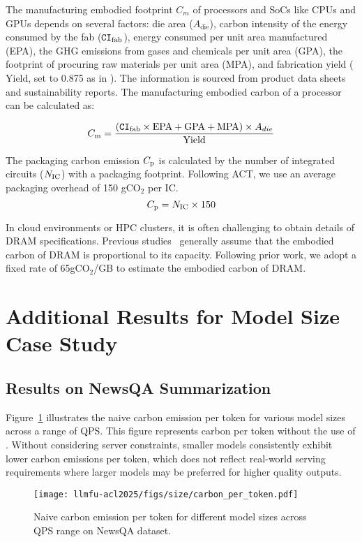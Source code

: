 The manufacturing embodied footprint $C_m$ of processors and SoCs like CPUs and GPUs depends on several factors: die area ($A_{\text{die}}$), carbon intensity of the energy consumed by the fab ($\texttt{CI}_{\rm fab}$), energy consumed per unit area manufactured (EPA), the GHG emissions from gases and chemicals per unit area (GPA), the footprint of procuring raw materials per unit area (MPA), and fabrication yield ($\text{Yield}$, set to 0.875 as in \citet{gupta2022act}). The information is sourced from product data sheets and sustainability reports. The manufacturing embodied carbon of a processor can be calculated as:

\begin{equation}
    C_{\rm m} = \frac{(\texttt{CI}_{\rm fab} \times \text{EPA} + \text{GPA} + \text{MPA})\times A_{die}}{\text{Yield}}
\end{equation}

The packaging carbon emission $C_{\rm p}$ is calculated by the number of integrated circuits ($N_{\rm IC}$) with a packaging footprint. Following ACT,  we use an average packaging overhead of 150 gCO$_2$ per IC.
\begin{equation}
    C_{\rm p} = N_{\rm IC} \times 150
\end{equation}

In cloud environments or HPC clusters, it is often challenging to obtain details of DRAM specifications. Previous studies~\cite{li2023toward, mem2023} generally assume that the embodied carbon of DRAM is proportional to its capacity. Following prior work, we adopt a fixed rate of 65gCO$_2$/GB to estimate the embodied carbon of DRAM.



\section{Additional Results for Model Size Case Study}\label{sec:appendix_model_size}

\subsection{Results on NewsQA Summarization}
\label{sec:appendix_model_size_newsqa}
Figure~\ref{fig:size_carbon_per_token} illustrates the naive carbon emission per token for various model sizes across a range of QPS. This figure represents carbon per token without the use of \SYSTEM{}. Without considering server constraints, smaller models consistently exhibit lower carbon emissions per token, which does not reflect real-world serving requirements where larger models may be preferred for higher quality outputs.
\begin{figure}[!t]
    \centering
    \texttt{[image: llmfu-acl2025/figs/size/carbon\_per\_token.pdf]}
    \caption{Naive carbon emission per token for different model sizes across QPS range on NewsQA dataset.}
    \label{fig:size_carbon_per_token}
\end{figure}

